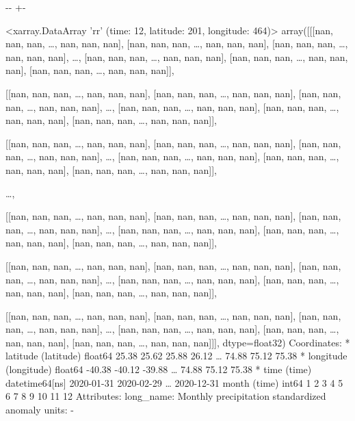 \documentclass[letterpaper,10pt,english]{sphinxmanual}
\newlength\nbsphinxcodecellspacing
\begin{document}
{

\kern-\sphinxverbatimsmallskipamount\kern-\baselineskip
\kern+\FrameHeightAdjust\kern-\fboxrule
\vspace{\nbsphinxcodecellspacing}

\begin{sphinxVerbatim}[commandchars=\\\{\}]
\llap{\color{nbsphinxout}[38]:\,\hspace{\fboxrule}\hspace{\fboxsep}}<xarray.DataArray 'rr' (time: 12, latitude: 201, longitude: 464)>
array([[[nan, nan, nan, {\ldots}, nan, nan, nan],
        [nan, nan, nan, {\ldots}, nan, nan, nan],
        [nan, nan, nan, {\ldots}, nan, nan, nan],
        {\ldots},
        [nan, nan, nan, {\ldots}, nan, nan, nan],
        [nan, nan, nan, {\ldots}, nan, nan, nan],
        [nan, nan, nan, {\ldots}, nan, nan, nan]],

       [[nan, nan, nan, {\ldots}, nan, nan, nan],
        [nan, nan, nan, {\ldots}, nan, nan, nan],
        [nan, nan, nan, {\ldots}, nan, nan, nan],
        {\ldots},
        [nan, nan, nan, {\ldots}, nan, nan, nan],
        [nan, nan, nan, {\ldots}, nan, nan, nan],
        [nan, nan, nan, {\ldots}, nan, nan, nan]],

       [[nan, nan, nan, {\ldots}, nan, nan, nan],
        [nan, nan, nan, {\ldots}, nan, nan, nan],
        [nan, nan, nan, {\ldots}, nan, nan, nan],
        {\ldots},
        [nan, nan, nan, {\ldots}, nan, nan, nan],
        [nan, nan, nan, {\ldots}, nan, nan, nan],
        [nan, nan, nan, {\ldots}, nan, nan, nan]],

       {\ldots},

       [[nan, nan, nan, {\ldots}, nan, nan, nan],
        [nan, nan, nan, {\ldots}, nan, nan, nan],
        [nan, nan, nan, {\ldots}, nan, nan, nan],
        {\ldots},
        [nan, nan, nan, {\ldots}, nan, nan, nan],
        [nan, nan, nan, {\ldots}, nan, nan, nan],
        [nan, nan, nan, {\ldots}, nan, nan, nan]],

       [[nan, nan, nan, {\ldots}, nan, nan, nan],
        [nan, nan, nan, {\ldots}, nan, nan, nan],
        [nan, nan, nan, {\ldots}, nan, nan, nan],
        {\ldots},
        [nan, nan, nan, {\ldots}, nan, nan, nan],
        [nan, nan, nan, {\ldots}, nan, nan, nan],
        [nan, nan, nan, {\ldots}, nan, nan, nan]],

       [[nan, nan, nan, {\ldots}, nan, nan, nan],
        [nan, nan, nan, {\ldots}, nan, nan, nan],
        [nan, nan, nan, {\ldots}, nan, nan, nan],
        {\ldots},
        [nan, nan, nan, {\ldots}, nan, nan, nan],
        [nan, nan, nan, {\ldots}, nan, nan, nan],
        [nan, nan, nan, {\ldots}, nan, nan, nan]]], dtype=float32)
Coordinates:
  * latitude   (latitude) float64 25.38 25.62 25.88 26.12 {\ldots} 74.88 75.12 75.38
  * longitude  (longitude) float64 -40.38 -40.12 -39.88 {\ldots} 74.88 75.12 75.38
  * time       (time) datetime64[ns] 2020-01-31 2020-02-29 {\ldots} 2020-12-31
    month      (time) int64 1 2 3 4 5 6 7 8 9 10 11 12
Attributes:
    long\_name:  Monthly precipitation standardized anomaly
    units:      -
\end{sphinxVerbatim}
}
\end{document}
